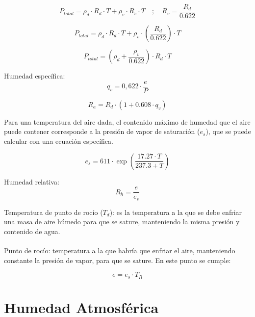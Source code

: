 \begin{equation}
    P_{total} = \rho_d \cdot R_d \cdot T + \rho_v \cdot R_v \cdot T \quad ; \quad R_v = \frac{R_d}{0.622}
\end{equation}
    
\begin{equation}
    P_{total} = \rho_d \cdot R_d \cdot T + \rho_v \cdot \left(\frac{R_d}{0.622}\right) \cdot T
\end{equation}
    
\begin{equation}
    P_{total} = \left(\rho_d + \frac{\rho_v}{0.622}\right) \cdot R_d \cdot T
\end{equation}

Humedad específica: 
\begin{equation}
    q_v = 0,622 \cdot \frac{e}{P}
\end{equation}

\begin{equation}
    R_a = R_d \cdot \left(1 + 0.608 \cdot q_v \right)
\end{equation}

Para una temperatura del aire dada, el contenido máximo de humedad que el aire puede contener corresponde a la presión de vapor de saturación (\(e_s\)), que se puede calcular con una ecuación específica.

\begin{equation}
    e_s = 611 \cdot \exp\left(\frac{17.27 \cdot T}{237.3 + T}\right)
\end{equation}

Humedad relativa:
\begin{equation}
    R_h = \frac{e}{e_s}
\end{equation}

Temperatura de punto de rocío (\(T_d\)): es la temperatura a la que se debe enfriar una masa de aire húmedo para que se sature, manteniendo la misma presión y contenido de agua.
\\\\
Punto de rocío: temperatura a la que habría que enfriar el aire, manteniendo constante la presión de vapor, para que se sature. En este punto se cumple:

\begin{equation}
    e = e_s \cdot T_R
\end{equation}

\section{Humedad Atmosférica}








